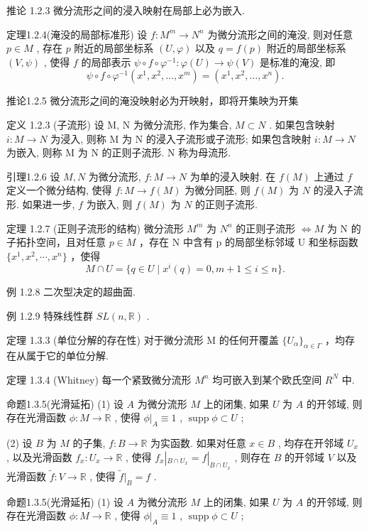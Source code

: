 \documentclass[]{article}
\begin{document}
推论 1.2.3 微分流形之间的浸入映射在局部上必为嵌入. 

定理1.2.4(淹没的局部标准形) 设 $f: M^{m} \to N^{n}$ 为微分流形之间的淹没, 则对任意 $p \in M$ , 存在 $p$ 附近的局部坐标系 $(U, \varphi)$ 以及 $q = f(p)$ 附近的局部坐标系 $(V, \psi)$ , 使得 $f$ 的局部表示 $\psi \circ f \circ \varphi^{-1}: \varphi(U) \to \psi(V)$ 是标准的淹没, 即 $$
\psi \circ f \circ \varphi^ {- 1} (x ^ {1}, x ^ {2}, \dots , x ^ {m}) = (x ^ {1}, x ^ {2}, \dots , x ^ {n}).
$$

推论1.2.5 微分流形之间的淹没映射必为开映射，即将开集映为开集 

定义 1.2.3 (子流形) 设 M, N 为微分流形, 作为集合, $M \subset N$ . 如果包含映射 $i: M \rightarrow N$ 为浸入, 则称 M 为 N 的浸入子流形或子流形; 如果包含映射 $i: M \rightarrow N$ 为嵌入, 则称 M 为 N 的正则子流形. N 称为母流形. 

引理1.2.6 设 $M, N$ 为微分流形, $f: M \to N$ 为单的浸入映射. 在 $f(M)$ 上通过 $f$ 定义一个微分结构, 使得 $f: M \to f(M)$ 为微分同胚, 则 $f(M)$ 为 $N$ 的浸入子流形. 如果进一步, $f$ 为嵌入, 则 $f(M)$ 为 $N$ 的正则子流形. 

定理 1.2.7 (正则子流形的结构) 微分流形 $M^{m}$ 为 $N^{n}$ 的正则子流形 $\Longleftrightarrow M$ 为 N 的子拓扑空间，且对任意 $p \in M$ ，存在 N 中含有 p 的局部坐标邻域 U 和坐标函数 $\{x^{1}, x^{2}, \cdots, x^{n}\}$ ，使得 $$
M \cap U = \{q \in U \mid x ^ {i} (q) = 0, m + 1 \leqslant i \leqslant n \}.
$$

例 1.2.8 二次型决定的超曲面. 

例 1.2.9 特殊线性群 $SL(n,\mathbb{R})$ . 

定理 1.3.3 (单位分解的存在性) 对于微分流形 M 的任何开覆盖 $\{U_{\alpha}\}_{\alpha\in\Gamma}$ ，均存在从属于它的单位分解. 

定理 1.3.4 (Whitney) 每一个紧致微分流形 $M^{n}$ 均可嵌入到某个欧氏空间 $R^{N}$ 中. 

命题1.3.5(光滑延拓) (1) 设 $A$ 为微分流形 $M$ 上的闭集, 如果 $U$ 为 $A$ 的开邻域, 则存在光滑函数 $\phi: M \to \mathbb{R}$ , 使得 $\phi|_{A} \equiv 1$ , $\operatorname{supp}\phi \subset U$ ; 

(2) 设 $B$ 为 $M$ 的子集, $f: B \to \mathbb{R}$ 为实函数. 如果对任意 $x \in B$ , 均存在开邻域 $U_x$ , 以及光滑函数 $f_x: U_x \to \mathbb{R}$ , 使得 $f_x|_{B \cap U_x} = f|_{B \cap U_x}$ , 则存在 $B$ 的开邻域 $V$ 以及光滑函数 $\tilde{f}: V \to \mathbb{R}$ , 使得 $\tilde{f}|_B = f$ . 

命题1.3.5(光滑延拓) (1) 设 $A$ 为微分流形 $M$ 上的闭集, 如果 $U$ 为 $A$ 的开邻域, 则存在光滑函数 $\phi: M \to \mathbb{R}$ , 使得 $\phi|_{A} \equiv 1$ , $\operatorname{supp}\phi \subset U$ ; 
\end{document}
